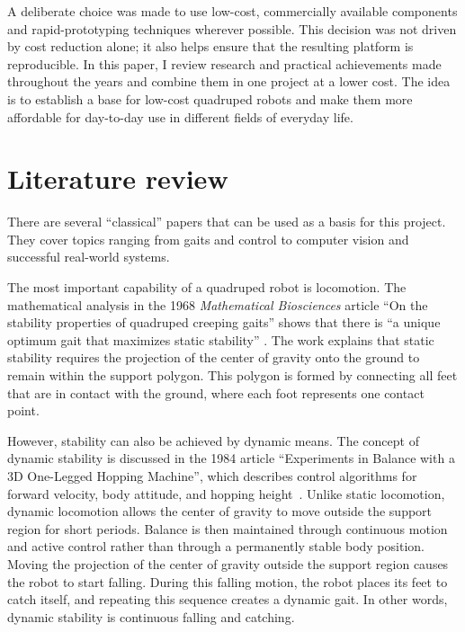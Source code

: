 \documentclass[a4paper,12pt]{report}
\begin{document}
A deliberate choice was made to use low-cost, commercially available components and
rapid-prototyping techniques wherever possible. This decision was not driven by cost reduction
alone; it also helps ensure that the resulting platform is reproducible. In this paper, I review
research and practical achievements made throughout the years and combine them in one project at a
lower cost. The idea is to establish a base for low-cost quadruped robots and make them more
affordable for day-to-day use in different fields of everyday life.

\section{Literature review}
\label{sec:literature-review}
There are several ``classical'' papers that can be used as a basis for this project. They cover
topics ranging from gaits and control to computer vision and successful real-world systems.

The most important capability of a quadruped robot is locomotion. The mathematical analysis in the
1968 \textit{Mathematical Biosciences} article ``On the stability properties of quadruped creeping
gaits'' shows that there is ``a unique optimum gait that maximizes static
stability'' \parencite[331]{mcghee1968}. The work explains that static stability requires the
projection of the center of gravity onto the ground to remain within the support polygon. This
polygon is formed by connecting all feet that are in contact with the ground, where each foot
represents one contact point.

However, stability can also be achieved by dynamic means. The concept of dynamic stability is
discussed in the 1984 article ``Experiments in Balance with a 3D One-Legged Hopping Machine'',
which describes control algorithms for forward velocity, body attitude, and hopping
height~\parencite{raibert1984}. Unlike static locomotion, dynamic locomotion allows the center of
gravity to move outside the support region for short periods. Balance is then maintained through
continuous motion and active control rather than through a permanently stable body position. Moving
the projection of the center of gravity outside the support region causes the robot to start
falling. During this falling motion, the robot places its feet to catch itself, and repeating this
sequence creates a dynamic gait. In other words, dynamic stability is continuous falling and
catching.
\end{document}
